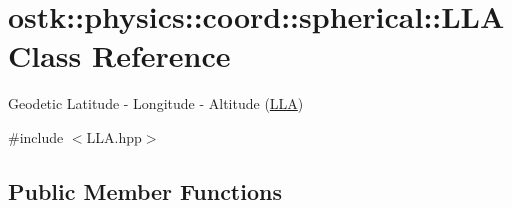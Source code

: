 \hypertarget{classostk_1_1physics_1_1coord_1_1spherical_1_1_l_l_a}{}\section{ostk\+:\+:physics\+:\+:coord\+:\+:spherical\+:\+:L\+LA Class Reference}
\label{classostk_1_1physics_1_1coord_1_1spherical_1_1_l_l_a}


Geodetic Latitude -\/ Longitude -\/ Altitude (\hyperlink{classostk_1_1physics_1_1coord_1_1spherical_1_1_l_l_a}{L\+LA})  




{\ttfamily \#include $<$L\+L\+A.\+hpp$>$}

\subsection*{Public Member Functions}
